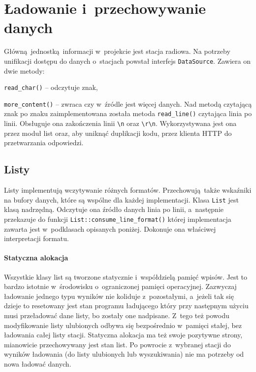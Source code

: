 \documentclass[polish]{aghengthesis}
\let\tempone\itemize
\let\temptwo\enditemize
\renewenvironment{itemize}{\tempone\setlength{\itemsep}{0cm}}{\temptwo}
\begin{document}
	\section{Ładowanie i~przechowywanie danych}
		Główną jednostką informacji w~projekcie jest stacja radiowa. Na potrzeby unifikacji dostępu do danych o~stacjach powstał interfejs \lstinline|DataSource|. Zawiera on dwie metody:
		\begin{itemize}
			\item \lstinline|read_char()| -- odczytuje znak,
			\item \lstinline|more_content()| -- zwraca czy w~źródle jest więcej danych.
		\end{itemize}
		Nad metodą czytającą znak po znaku zaimplementowana została metoda \lstinline|read_line()| czytająca linia po linii. Obsługuje ona zakończenia linii \lstinline|\n| oraz \lstinline|\r\n|. Wykorzystywana jest ona przez moduł list oraz, aby uniknąć duplikacji kodu, przez klienta HTTP do przetwarzania odpowiedzi.
		
		\subsection{Listy}
			Listy implementują wczytywanie różnych formatów. Przechowują także wskaźniki na bufory danych, które są wspólne dla każdej implementacji. Klasa \lstinline|List| jest klasą nadrzędną. Odczytuje ona źródło danych linia po linii, a~następnie przekazuje do funkcji \lstinline|List::consume_line_format()| której implementacja zawarta jest w~podklasach opisanych poniżej. Dokonuje ona właściwej interpretacji formatu.
			
			\paragraph{Statyczna alokacja} Wszystkie klasy list są tworzone statycznie i~współdzielą pamięć wpisów. Jest to bardzo istotnie w~środowisku o~ograniczonej pamięci operacyjnej. Zazwyczaj ładowanie jednego typu wyników nie koliduje z~pozostałymi, a~jeżeli tak się dzieje to resetowany jest stan programu ładującego który przy następnym użyciu musi przeładować dane listy, bo zostały one nadpisane. Z~tego też powodu modyfikowanie listy ulubionych odbywa się bezpośrednio w~pamięci stałej, bez ładowania całej listy stacji. Statyczna alokacja ma też swoje pozytywne strony, mianowicie przechowywany jest stan list. Po powrocie z~wybranej stacji do wyników ładowania (do listy ulubionych lub wyszukiwania) nie ma potrzeby od nowa ładować danych.
			
\end{document}

